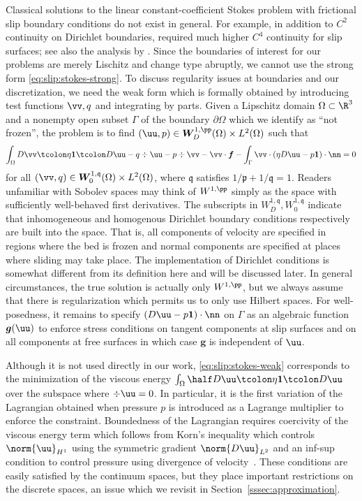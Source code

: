 Classical solutions to the linear constant-coefficient Stokes problem with frictional slip boundary conditions do not exist in general.
For example, in addition to $C^2$ continuity on Dirichlet boundaries, \cite{saito2004stokes} required much higher $C^4$ continuity for slip surfaces; see also the analysis by \cite{fujita2002coherent}.
Since the boundaries of interest for our problems are merely Lischitz and change type abruptly, we cannot use the strong form \eqref{eq:slip:stokes-strong}.
To discuss regularity issues at boundaries and our discretization, we need the weak form which is formally obtained by introducing test functions $\vv,q$ and integrating by parts.
Given a Lipschitz domain $\Omega \subset \R^3$ and a nonempty open subset $\Gamma$ of the boundary $\partial\Omega$ which we identify as ``not frozen'', the problem is to find $(\uu,p) \in \bm W_D^{1,\pp}(\Omega) \times L^2(\Omega)$ such that
\begin{multline}\label{eq:slip:stokes-weak}
  \int_\Omega D\vv\tcolon \eta\bm 1 \tcolon D\uu - q\div\uu - p\div\vv - \vv\cdot\bm f
  - \int_\Gamma \vv\cdot (\eta D\uu - p\bm 1)\cdot\nn = 0
\end{multline}
for all $(\vv,q)\in \bm W_0^{1,\mathfrak{q}}(\Omega) \times L^2(\Omega)$, where $\mathfrak q$ satisfies $1/\mathfrak p + 1/\mathfrak q = 1$.
Readers unfamiliar with Sobolev spaces may think of $W^{1,\pp}$ simply as the space with sufficiently well-behaved first derivatives.
The subscripts in $W_D^{1,\mathfrak{q}},W_0^{1,\mathfrak{q}}$ indicate that inhomogeneous and homogenous Dirichlet boundary conditions respectively are built into the space.
That is, all components of velocity are specified in regions where the bed is frozen and normal components are specified at places where sliding may take place.
The implementation of Dirichlet conditions is somewhat different from its definition here and will be discussed later.
In general circumstances, the true solution is actually only $W^{1,\pp}$, but we always assume that there is regularization which permits us to only use Hilbert spaces.
For well-posedness, it remains to specify $(D\uu - p\bm 1)\cdot\nn$ on $\Gamma$ as an algebraic function $\bm g(\uu)$ to enforce stress conditions on tangent components at slip surfaces and on all components at free surfaces in which case $\bm g$ is independent of $\uu$.

Although it is not used directly in our work, \eqref{eq:slip:stokes-weak} corresponds to the minimization of the viscous energy $\int_\Omega \half D\uu\tcolon \eta\bm 1 \tcolon D\uu$ over the subspace where $\div\uu = 0$.
In particular, it is the first variation of the Lagrangian obtained when pressure $p$ is introduced as a Lagrange multiplier to enforce the constraint.
Boundedness of the Lagrangian requires coercivity of the viscous energy term which follows from Korn's inequality which controls $\norm{\uu}_{H^1}$ using the symmetric gradient $\norm{D\uu}_{L^2}$
and an inf-sup condition to control pressure using divergence of velocity~\cite{evans1998partial,brenner2008mathematical}.
These conditions are easily satisfied by the continuum spaces, but they place important restrictions on the discrete spaces, an issue which we revisit in Section~\ref{sssec:approximation}.

